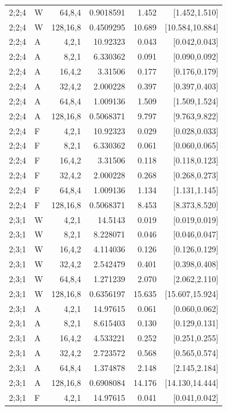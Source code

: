 {\begin{longtable}{@{}llrrrr@{}}
2;2;4 & W & 64,8,4 & 0.9018591 & 1.452 & [1.452,1.510] \\
2;2;4 & W & 128,16,8 & 0.4509295 & 10.689 & [10.584,10.884] \\
2;2;4 & A & 4,2,1 & 10.92323 & 0.043 & [0.042,0.043] \\
2;2;4 & A & 8,2,1 & 6.330362 & 0.091 & [0.090,0.092] \\
2;2;4 & A & 16,4,2 & 3.31506 & 0.177 & [0.176,0.179] \\
2;2;4 & A & 32,4,2 & 2.000228 & 0.397 & [0.397,0.403] \\
2;2;4 & A & 64,8,4 & 1.009136 & 1.509 & [1.509,1.524] \\
2;2;4 & A & 128,16,8 & 0.5068371 & 9.797 & [9.763,9.822] \\
2;2;4 & F & 4,2,1 & 10.92323 & 0.029 & [0.028,0.033] \\
2;2;4 & F & 8,2,1 & 6.330362 & 0.061 & [0.060,0.065] \\
2;2;4 & F & 16,4,2 & 3.31506 & 0.118 & [0.118,0.123] \\
2;2;4 & F & 32,4,2 & 2.000228 & 0.268 & [0.268,0.273] \\
2;2;4 & F & 64,8,4 & 1.009136 & 1.134 & [1.131,1.145] \\
2;2;4 & F & 128,16,8 & 0.5068371 & 8.453 & [8.373,8.520] \\
2;3;1 & W & 4,2,1 & 14.5143 & 0.019 & [0.019,0.019] \\
2;3;1 & W & 8,2,1 & 8.228071 & 0.046 & [0.046,0.047] \\
2;3;1 & W & 16,4,2 & 4.114036 & 0.126 & [0.126,0.129] \\
2;3;1 & W & 32,4,2 & 2.542479 & 0.401 & [0.398,0.408] \\
2;3;1 & W & 64,8,4 & 1.271239 & 2.070 & [2.062,2.110] \\
2;3;1 & W & 128,16,8 & 0.6356197 & 15.635 & [15.607,15.924] \\
2;3;1 & A & 4,2,1 & 14.97615 & 0.061 & [0.060,0.062] \\
2;3;1 & A & 8,2,1 & 8.615403 & 0.130 & [0.129,0.131] \\
2;3;1 & A & 16,4,2 & 4.533221 & 0.252 & [0.251,0.255] \\
2;3;1 & A & 32,4,2 & 2.723572 & 0.568 & [0.565,0.574] \\
2;3;1 & A & 64,8,4 & 1.374878 & 2.148 & [2.145,2.184] \\
2;3;1 & A & 128,16,8 & 0.6908084 & 14.176 & [14.130,14.444] \\
2;3;1 & F & 4,2,1 & 14.97615 & 0.041 & [0.041,0.042] \\

\end{longtable}}
